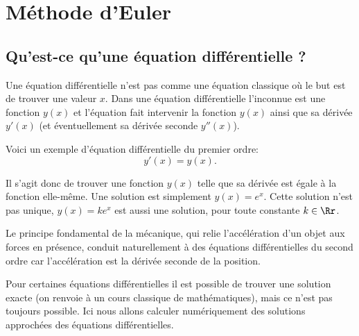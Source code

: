 \documentclass[11pt,class=report,crop=false]{standalone}
\begin{document}







\section{Méthode d'Euler}

\subsection{Qu'est-ce qu'une équation différentielle ?}

Une équation différentielle n'est pas comme une équation classique où le but est de trouver une valeur $x$. 
Dans une équation différentielle l'inconnue est une fonction $y(x)$ et l'équation fait intervenir la fonction $y(x)$ ainsi que sa dérivée $y'(x)$ (et éventuellement sa dérivée seconde $y''(x)$). 

Voici un exemple d'équation différentielle du premier ordre:
$$y'(x) = y(x).$$

Il s'agit donc de trouver une fonction $y(x)$ telle que sa dérivée est égale à la fonction elle-même.
Une solution est simplement $y(x)= e^x$. Cette solution n'est pas unique, $y(x) = k e^x$ est aussi une solution, pour toute constante $k \in \Rr$.

Le principe fondamental de la mécanique, qui relie l'accélération d'un objet aux forces en présence, conduit naturellement à des équations différentielles du second ordre car l'accélération est la dérivée seconde de la position.

Pour certaines équations différentielles il est possible de trouver une solution exacte (on renvoie à un cours classique de mathématiques), mais ce n'est pas toujours possible.
Ici nous allons calculer numériquement des solutions approchées des équations différentielles.
\end{document}
